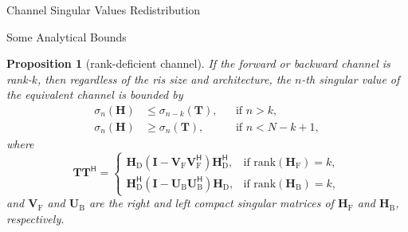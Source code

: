 \documentclass[journal]{IEEEtran}
\newtheorem{proposition}{Proposition}
\begin{document}
\begin{section}{Channel Singular Values Redistribution}
\begin{subsection}{Some Analytical Bounds}
		\begin{proposition}[rank-deficient channel]\label{pp:rank_deficient}
			If the forward or backward channel is rank-$k$, then regardless of the \gls{ris} size and architecture, the $n$-th singular value of the equivalent channel is bounded by
			\begin{align}
				\sigma_n(\mathbf{H}) & \le \sigma_{n-k}(\mathbf{T}), && \text{if } n > k, \label{iq:sv_bound_enlarge}\\
				\sigma_n(\mathbf{H}) & \ge \sigma_n(\mathbf{T}), && \text{if } n < N - k + 1, \label{iq:sv_bound_suppress}
			\end{align}
			where
			\begin{equation}
				\mathbf{T} \mathbf{T}^\mathsf{H} =
				\begin{cases}
					\mathbf{H}_\mathrm{D} (\mathbf{I} - \mathbf{V}_\mathrm{F} \mathbf{V}_\mathrm{F}^\mathsf{H}) \mathbf{H}_\mathrm{D}^\mathsf{H}, & \text{if } \mathrm{rank}(\mathbf{H}_\mathrm{F}) = k, \\
					\mathbf{H}_\mathrm{D}^\mathsf{H} (\mathbf{I} - \mathbf{U}_\mathrm{B} \mathbf{U}_\mathrm{B}^\mathsf{H}) \mathbf{H}_\mathrm{D}, & \text{if } \mathrm{rank}(\mathbf{H}_\mathrm{B}) = k,
				\end{cases}
				\label{eq:auxiliary_matrix}
			\end{equation}
			and $\mathbf{V}_\mathrm{F}$ and $\mathbf{U}_\mathrm{B}$ are the right and left compact singular matrices of $\mathbf{H}_\mathrm{F}$ and $\mathbf{H}_\mathrm{B}$, respectively.

\end{proposition}
\end{subsection}
\end{section}
\end{document}
